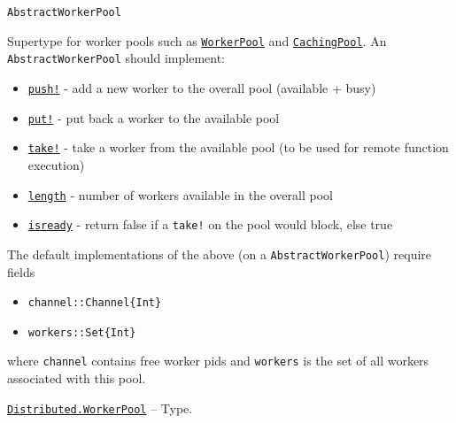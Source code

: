 \begin{adjustwidth}{2em}{0pt}


\begin{verbatim}
AbstractWorkerPool
\end{verbatim}

Supertype for worker pools such as \hyperlink{17976394752057970100}{\texttt{WorkerPool}} and \hyperlink{8617353702639655725}{\texttt{CachingPool}}. An \texttt{AbstractWorkerPool} should implement:

\begin{itemize}
\item \hyperlink{18026893834387542681}{\texttt{push!}} - add a new worker to the overall pool (available + busy)


\item \hyperlink{12719543094136814100}{\texttt{put!}} - put back a worker to the available pool


\item \hyperlink{4963355246106153560}{\texttt{take!}} - take a worker from the available pool (to be used for remote function execution)


\item \hyperlink{9362803119463040896}{\texttt{length}} - number of workers available in the overall pool


\item \hyperlink{15888554370655089980}{\texttt{isready}} - return false if a \texttt{take!} on the pool would block, else true

\end{itemize}
The default implementations of the above (on a \texttt{AbstractWorkerPool}) require fields

\begin{itemize}
\item \texttt{channel::Channel\{Int\}}


\item \texttt{workers::Set\{Int\}}

\end{itemize}
where \texttt{channel} contains free worker pids and \texttt{workers} is the set of all workers associated with this pool.



\end{adjustwidth}
\hypertarget{17976394752057970100}{} 
\hyperlink{17976394752057970100}{\texttt{Distributed.WorkerPool}}  -- {Type.}

